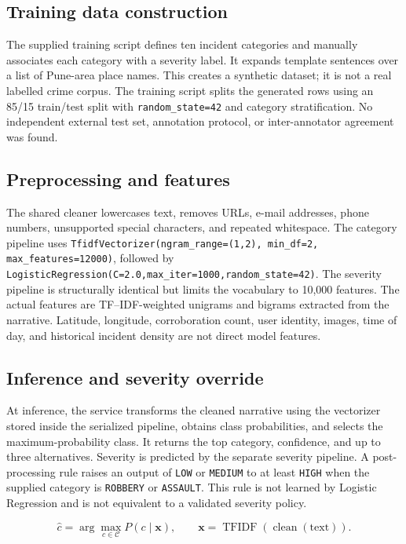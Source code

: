 \documentclass[11pt]{article}
\begin{document}
\subsection{Training data construction}

The supplied training script defines ten incident categories and manually
associates each category with a severity label. It expands template
sentences over a list of Pune-area place names. This creates a synthetic
dataset; it is not a real labelled crime corpus. The training script splits
the generated rows using an 85/15 train/test split with
\texttt{random\_state=42} and category stratification. No independent
external test set, annotation protocol, or inter-annotator agreement was
found.

\subsection{Preprocessing and features}

The shared cleaner lowercases text, removes URLs, e-mail addresses, phone
numbers, unsupported special characters, and repeated whitespace. The
category pipeline uses
\texttt{TfidfVectorizer(ngram\_range=(1,2), min\_df=2,
max\_features=12000)}, followed by
\texttt{LogisticRegression(C=2.0,max\_iter=1000,random\_state=42)}. The
severity pipeline is structurally identical but limits the vocabulary to
10,000 features. The actual features are TF--IDF-weighted unigrams and
bigrams extracted from the narrative. Latitude, longitude, corroboration
count, user identity, images, time of day, and historical incident density
are not direct model features.

\subsection{Inference and severity override}

At inference, the service transforms the cleaned narrative using the
vectorizer stored inside the serialized pipeline, obtains class
probabilities, and selects the maximum-probability class. It returns the
top category, confidence, and up to three alternatives. Severity is
predicted by the separate severity pipeline. A post-processing rule raises
an output of \texttt{LOW} or \texttt{MEDIUM} to at least \texttt{HIGH} when
the supplied category is \texttt{ROBBERY} or \texttt{ASSAULT}. This rule is
not learned by Logistic Regression and is not equivalent to a validated
severity policy.

\begin{equation}
\hat{c}=\arg\max_{c\in\mathcal{C}} P(c\mid \boldsymbol{x}), \qquad
\boldsymbol{x}=\operatorname{TFIDF}(\operatorname{clean}(\text{text})).
\label{eq:prediction}
\end{equation}
\end{document}

